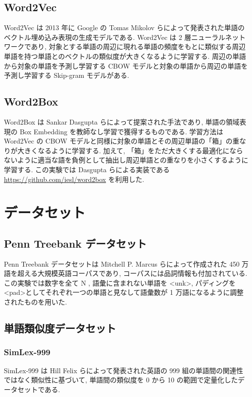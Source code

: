 \documentclass[twocolumn]{jarticle}     %
\begin{document}
\subsection{Word2Vec}
Word2Vec\cite{word2vec} は 2013 年に Google の Tomas Mikolov らによって発表された単語のベクトル埋め込み表現の生成モデルである. 
Word2Vec は 2 層ニューラルネットワークであり, 対象とする単語の周辺に現れる単語の頻度をもとに類似する周辺単語を持つ単語とのベクトルの類似度が大きくなるように学習する. 
周辺の単語から対象の単語を予測し学習する CBOW モデルと対象の単語から周辺の単語を予測し学習する Skip-gram モデルがある.

\subsection{Word2Box}
Word2Box\cite{dasgupta-etal-2022-word2box} は Sankar Dasgupta らによって提案された手法であり, 単語の領域表現の Box Embedding を教師なし学習で獲得するものである. 
学習方法は Word2Vec の CBOW モデルと同様に対象の単語とその周辺単語の「箱」の重なりが大きくなるように学習する. 
加えて, 「箱」をただ大きくする最適化にならないように適当な語を負例として抽出し周辺単語との重なりを小さくするように学習する. 
この実験では Dasgupta らによる実装である \url{https://github.com/iesl/word2box} を利用した. 

\section{データセット}
\subsection{Penn Treebank データセット}
Penn Treebank データセット\cite{ptb}は 	Mitchell P. Marcus らによって作成された 450 万語を超える大規模英語コーパスであり, コーパスには品詞情報も付加されている. 
この実験では数字を全て N , 語彙に含まれない単語を \textless unk\textgreater , パディングを \textless pad\textgreater としてそれぞれ一つの単語と見なして語彙数が 1 万語になるように調整されたものを用いた.

\subsection{単語類似度データセット}
\subsubsection{SimLex-999}
SimLex-999\cite{simlex999} は Hill Felix らによって発表された英語の 999 組の単語間の関連性ではなく類似性に基づいて, 単語間の類似度を 0 から 10 の範囲で定量化したデータセットである. 
\end{document}
